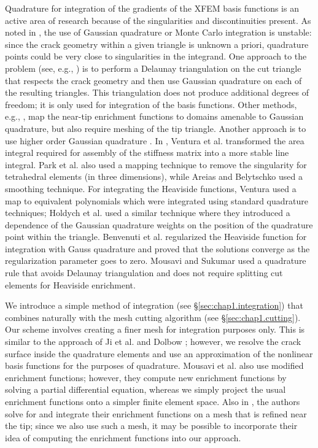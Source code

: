 Quadrature for integration of the gradients of the XFEM basis functions is an active area of research because of the singularities and discontinuities present. As noted in \cite{Daux00}, the use of Gaussian quadrature or Monte Carlo integration is unstable: since the crack geometry within a given triangle is unknown a priori, quadrature points could be very close to singularities in the integrand. One approach to the problem (see, e.g., \cite{Stazi03}) is to perform a Delaunay triangulation on the cut triangle that respects the crack geometry and then use Gaussian quadrature on each of the resulting triangles. This triangulation does not produce additional degrees of freedom; it is only used for integration of the basis functions. Other methods, e.g., \cite{Bechet05, Laborde05}, map the near-tip enrichment functions to domains amenable to Gaussian quadrature, but also require meshing of the tip triangle. Another approach is to use higher order Gaussian quadrature \cite{Strouboulis00}. In \cite{Ventura09}, Ventura et al. transformed the area integral required for assembly of the stiffness matrix into a more stable line integral. Park et al. \cite{Park09} also used a mapping technique to remove the singularity for tetrahedral elements (in three dimensions), while Areias and Belytschko \cite{Areias05} used a smoothing technique. For integrating the Heaviside functions, Ventura \cite{Ventura06} used a map to equivalent polynomials which were integrated using standard quadrature techniques; Holdych et al. \cite{Holdych08} used a similar technique where they introduced a dependence of the Gaussian quadrature weights on the position of the quadrature point within the triangle. Benvenuti et al. \cite{Benvenuti08} regularized the Heaviside function for integration with Gauss quadrature and proved that the solutions converge as the regularization parameter goes to zero. Mousavi and Sukumar \cite{Mousavi10} used a quadrature rule that avoids Delaunay triangulation and does not require splitting cut elements for Heaviside enrichment. 

We introduce a simple method of integration (see \S\ref{sec:chap1.integration}) that combines naturally with the mesh cutting algorithm (see \S\ref{sec:chap1.cutting}). Our scheme involves creating a finer mesh for integration purposes only. This is similar to the approach of Ji et al. \cite{Ji.H02} and Dolbow \cite{Dolbow99}; however, we resolve the crack surface inside the quadrature elements and use an approximation of the nonlinear basis functions for the purposes of quadrature. Mousavi et al. \cite{Mousavi11} also use modified enrichment functions; however, they compute new enrichment functions by solving a partial differential equation, whereas we simply project the usual enrichment functions onto a simpler finite element space. Also in \cite{Mousavi11}, the authors solve for and integrate their enrichment functions on a mesh that is refined near the tip; since we also use such a mesh, it may be possible to incorporate their idea of computing the enrichment functions into our approach.

